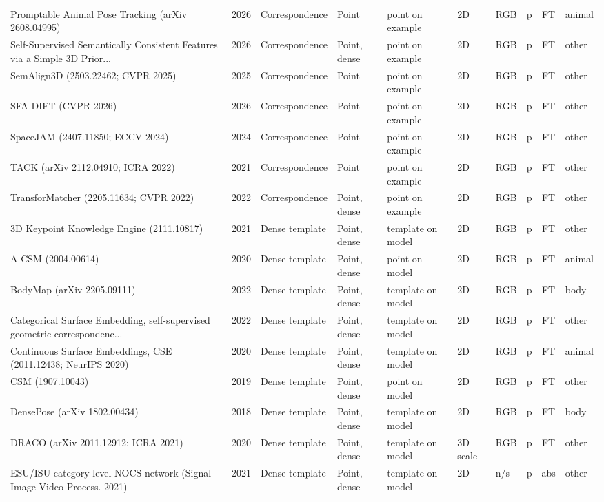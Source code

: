 {\begin{landscape}
\begin{longtable}{@{}p{4.6cm}rp{2.0cm}lllllcl@{}}
Promptable Animal Pose Tracking (arXiv 2608.04995) & 2026 & Correspondence & Point & point on example & 2D & RGB & p & FT & animal \\
Self-Supervised Semantically Consistent Features via a Simple 3D Prior... & 2026 & Correspondence & Point, dense & point on example & 2D & RGB & p & FT & other \\
SemAlign3D (2503.22462; CVPR 2025) & 2025 & Correspondence & Point & point on example & 2D & RGB & p & FT & other \\
SFA-DIFT (CVPR 2026) & 2026 & Correspondence & Point & point on example & 2D & RGB & p & FT & other \\
SpaceJAM (2407.11850; ECCV 2024) & 2024 & Correspondence & Point & point on example & 2D & RGB & p & FT & other \\
TACK (arXiv 2112.04910; ICRA 2022) & 2021 & Correspondence & Point & point on example & 2D & RGB & p & FT & other \\
TransforMatcher (2205.11634; CVPR 2022) & 2022 & Correspondence & Point, dense & point on example & 2D & RGB & p & FT & other \\
3D Keypoint Knowledge Engine (2111.10817) & 2021 & Dense template & Point, dense & template on model & 2D & RGB & p & FT & other \\
A-CSM (2004.00614) & 2020 & Dense template & Point, dense & point on model & 2D & RGB & p & FT & animal \\
BodyMap (arXiv 2205.09111) & 2022 & Dense template & Point, dense & template on model & 2D & RGB & p & FT & body \\
Categorical Surface Embedding, self-supervised geometric correspondenc... & 2022 & Dense template & Point, dense & template on model & 2D & RGB & p & FT & other \\
Continuous Surface Embeddings, CSE (2011.12438; NeurIPS 2020) & 2020 & Dense template & Point, dense & template on model & 2D & RGB & p & FT & animal \\
CSM (1907.10043) & 2019 & Dense template & Point, dense & point on model & 2D & RGB & p & FT & other \\
DensePose (arXiv 1802.00434) & 2018 & Dense template & Point, dense & template on model & 2D & RGB & p & FT & body \\
DRACO (arXiv 2011.12912; ICRA 2021) & 2020 & Dense template & Point, dense & template on model & 3D scale & RGB & p & FT & other \\
ESU/ISU category-level NOCS network (Signal Image Video Process. 2021) & 2021 & Dense template & Point, dense & template on model & 2D & n/s & p & abs & other \\

\end{longtable}
\end{landscape}}
